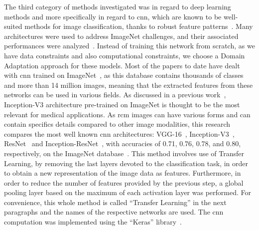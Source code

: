 \documentclass[journal,article,submit,moreauthors,pdftex, applsci]{Definitions/mdpi}
\begin{document}
The third category of methods investigated was in regard to deep learning methods and more specifically in regard to \ac{cnn}, which are known to be well-suited methods for image classification, thanks to robust feature patterns~\cite{Pathan2018}. Many architectures were used to address ImageNet challenges, and their associated performances were analyzed~\cite{Canziani2016}. Instead of training this network from scratch, as we have data constraints and also computational constraints, we choose a Domain Adaptation approach for these models. Most of the papers to date have dealt with \ac{cnn} trained on ImageNet~\cite{Deng2008}, as this database contains thousands of classes and more than 14 million images, meaning that the extracted features from these networks can be used in various fields. As discussed in a previous work~\cite{Litjens2017}, Inception-V3 architecture pre-trained on ImageNet is thought to be the most relevant for medical applications. As \ac{rcm} images can have various forms and can contain specifics details compared to other image modalities, this research compares the most well known \ac{cnn} architectures: VGG-16~\cite{Simonyan2014}, Inception-V3~\cite{Szegedy2015}, ResNet~\cite{He2016} and Inception-ResNet~\cite{Szegedy2017}, with accuracies of 0.71, 0.76, 0.78, and 0.80, respectively, on the ImageNet database~\cite{Canziani2016}. This method involves use of Transfer Learning, by removing the last layers devoted to the classification task, in order to obtain a new representation of the image data as features. Furthermore, in order to reduce the number of features provided by the previous step, a global pooling layer based on the maximum of each activation layer was performed. For convenience, this whole method is called “Transfer Learning” in the next paragraphs and the names of the respective networks are used. The \ac{cnn} computation was implemented using the “Keras” library~\cite{chollet2015keras}.\par

\end{document}
